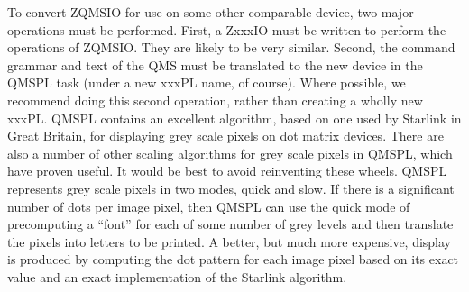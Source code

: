 To convert ZQMSIO for use on some other comparable device, two major
operations must be performed.  First, a ZxxxIO must be written to
perform the operations of ZQMSIO.  They are likely to be very similar.
Second, the command grammar and text of the QMS must be translated to
the new device in the QMSPL task (under a new xxxPL name, of course).
Where possible, we recommend doing this second operation, rather than
creating a wholly new xxxPL.  QMSPL contains an excellent algorithm,
based on one used by Starlink in Great Britain, for displaying grey
scale pixels on dot matrix devices.  There are also a number of other
scaling algorithms for grey scale pixels in QMSPL, which have proven
useful.  It would be best to avoid reinventing these wheels.  QMSPL
represents grey scale pixels in two modes, quick and slow.  If there
is a significant number of dots per image pixel, then QMSPL can use
the quick mode of precomputing a ``font'' for each of some number of
grey levels and then translate the pixels into letters to be printed.
A better, but much more expensive, display is produced by computing
the dot pattern for each image pixel based on its exact value and an
exact implementation of the Starlink algorithm.

